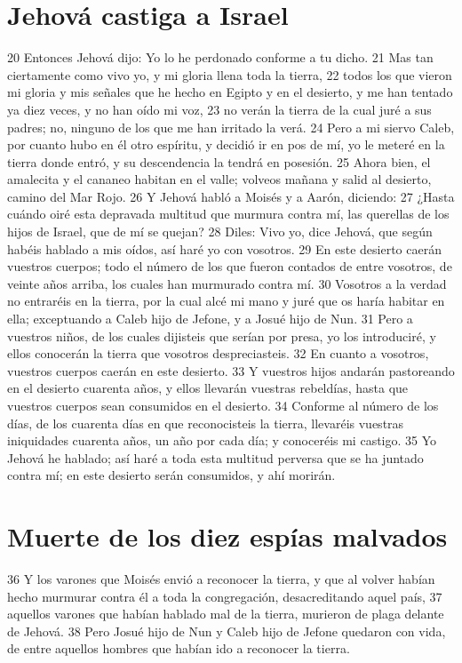 \section*{Jehová castiga a Israel }

20 Entonces Jehová dijo: Yo lo he perdonado conforme a tu dicho.
21 Mas tan ciertamente como vivo yo, y mi gloria llena toda la tierra,
22 todos los que vieron mi gloria y mis señales que he hecho en Egipto y en el desierto, y me han tentado ya diez veces, y no han oído mi voz,
23 no verán la tierra de la cual juré a sus padres; no, ninguno de los que me han irritado la verá.
24 Pero a mi siervo Caleb, por cuanto hubo en él otro espíritu, y decidió ir en pos de mí, yo le meteré en la tierra donde entró, y su descendencia la tendrá en posesión.
25 Ahora bien, el amalecita y el cananeo habitan en el valle; volveos mañana y salid al desierto, camino del Mar Rojo.
26 Y Jehová habló a Moisés y a Aarón, diciendo:
27 ¿Hasta cuándo oiré esta depravada multitud que murmura contra mí, las querellas de los hijos de Israel, que de mí se quejan?
28 Diles: Vivo yo, dice Jehová, que según habéis hablado a mis oídos, así haré yo con vosotros. 
29 En este desierto caerán vuestros cuerpos; todo el número de los que fueron contados de entre vosotros, de veinte años arriba, los cuales han murmurado contra mí.
30 Vosotros a la verdad no entraréis en la tierra, por la cual alcé mi mano y juré que os haría habitar en ella; exceptuando a Caleb hijo de Jefone, y a Josué hijo de Nun.
31 Pero a vuestros niños, de los cuales dijisteis que serían por presa, yo los introduciré, y ellos conocerán la tierra que vosotros despreciasteis.
32 En cuanto a vosotros, vuestros cuerpos caerán en este desierto.
33 Y vuestros hijos andarán pastoreando en el desierto cuarenta años, y ellos llevarán vuestras rebeldías, hasta que vuestros cuerpos sean consumidos en el desierto.
34 Conforme al número de los días, de los cuarenta días en que reconocisteis la tierra, llevaréis vuestras iniquidades cuarenta años, un año por cada día; y conoceréis mi castigo.
35 Yo Jehová he hablado; así haré a toda esta multitud perversa que se ha juntado contra mí; en este desierto serán consumidos, y ahí morirán.
\section*{Muerte de los diez espías malvados}

36 Y los varones que Moisés envió a reconocer la tierra, y que al volver habían hecho murmurar contra él a toda la congregación, desacreditando aquel país,
37 aquellos varones que habían hablado mal de la tierra, murieron de plaga delante de Jehová.
38 Pero Josué hijo de Nun y Caleb hijo de Jefone quedaron con vida, de entre aquellos hombres que habían ido a reconocer la tierra.
